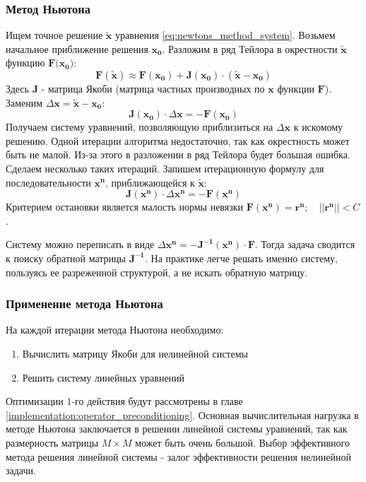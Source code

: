\subsubsection*{Метод Ньютона} Ищем точное решение $\mathbf{\tilde x}$ уравнения \eqref{eq:newtons_method_system}. Возьмем начальное приближение решения $\mathbf{x_0}$. Разложим в ряд Тейлора в окрестности $\mathbf{\tilde x}$ функцию $\mathbf{F}(\mathbf{x_0)}$:
\begin{equation}
\mathbf{F}(\mathbf{\tilde x}) \approx \mathbf{F}({\mathbf{x_0}}) + \mathbf{J}(\mathbf{x_0}) \cdot (\mathbf{\tilde x} - \mathbf{x_0})
\end{equation}
Здесь $\mathbf{J}$ - матрица Якоби (матрица частных производных по $\mathbf{x}$ функции $\mathbf{F}$). Заменим $\Delta \mathbf{x} = \mathbf{\tilde x} - \mathbf{x_0}$:
\begin{equation}
\mathbf{J}(\mathbf{x_0}) \cdot \Delta \mathbf{x} = - \mathbf{F}(\mathbf{x_0})
\end{equation}
Получаем систему уравнений, позволяющую приблизиться на $\Delta \mathbf{x}$ к искомому решению. Одной итерации алгоритма недостаточно, так как окрестность может быть не малой. Из-за этого в разложении в ряд Тейлора будет большая ошибка. Сделаем несколько таких итераций. Запишем итерационную формулу для последовательности $\mathbf{x^n}$, приближающейся к $\mathbf{\tilde x}$:
\begin{equation} \label{eq:newton_method}
\mathbf{J}(\mathbf{x^n}) \cdot \Delta \mathbf{x^n} = - \mathbf{F}(\mathbf{x^n})
\end{equation}
Критерием остановки является малость нормы невязки $\mathbf{F}(\mathbf{x^n}) = \mathbf{r^n};
\quad ||\mathbf{r^n}||< C$.
\par
Систему можно переписать в виде $\Delta \mathbf{x^n} = - \mathbf{J^{-1}}(\mathbf{x^n}) \cdot \mathbf{F}$. Тогда задача сводится к поиску обратной матрицы $\mathbf{J^{-1}}$. На практике легче решать именно систему, пользуясь ее разреженной структурой, а не искать обратную матрицу.
\subsubsection*{Применение метода Ньютона}
На каждой итерации метода Ньютона необходимо:
\begin{enumerate}
\item Вычислить матрицу Якоби для нелинейной системы
\item Решить систему линейных уравнений
\end{enumerate}
Оптимизации 1-го действия будут рассмотрены в главе \ref{implementation:operator_preconditioning}. Основная вычислительная нагрузка в методе Ньютона заключается в решении линейной системы уравнений, так как размерность матрицы $M \times M$ может быть очень большой. Выбор эффективного метода решения линейной системы - залог эффективности решения нелинейной задачи.


